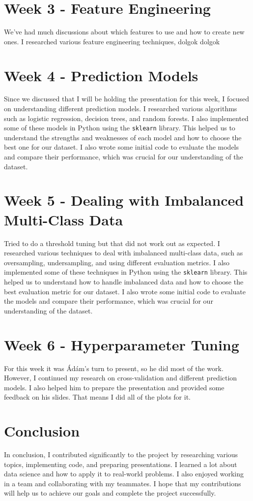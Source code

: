 \documentclass[a4paper,12pt]{article}
\begin{document}
\section{Week 3 - Feature Engineering}
We've had much discussions about which features to use and how to create new ones. I researched various feature engineering techniques, dolgok dolgok

\section{Week 4 - Prediction Models}
Since we discussed that I will be holding the presentation for this week, I focused on understanding different prediction models. I researched various algorithms such as logistic regression, decision trees, and random forests. I also implemented some of these models in Python using the \texttt{sklearn} library. This helped us to understand the strengths and weaknesses of each model and how to choose the best one for our dataset. I also wrote some initial code to evaluate the models and compare their performance, which was crucial for our understanding of the dataset.

\section{Week 5 - Dealing with Imbalanced Multi-Class Data}
Tried to do a threshold tuning but that did not work out as expected. I researched various techniques to deal with imbalanced multi-class data, such as oversampling, undersampling, and using different evaluation metrics. I also implemented some of these techniques in Python using the \texttt{sklearn} library. This helped us to understand how to handle imbalanced data and how to choose the best evaluation metric for our dataset. I also wrote some initial code to evaluate the models and compare their performance, which was crucial for our understanding of the dataset.

\section{Week 6 - Hyperparameter Tuning}
For this week it was Ádám's turn to present, so he did most of the work. However, I continued my research on cross-validation and different prediction models. I also helped him to prepare the presentation and provided some feedback on his slides. That means I did all of the plots for it. 

\section{Conclusion}
In conclusion, I contributed significantly to the project by researching various topics, implementing code, and preparing presentations. I learned a lot about data science and how to apply it to real-world problems. I also enjoyed working in a team and collaborating with my teammates. I hope that my contributions will help us to achieve our goals and complete the project successfully.

%
%
\end{document}
